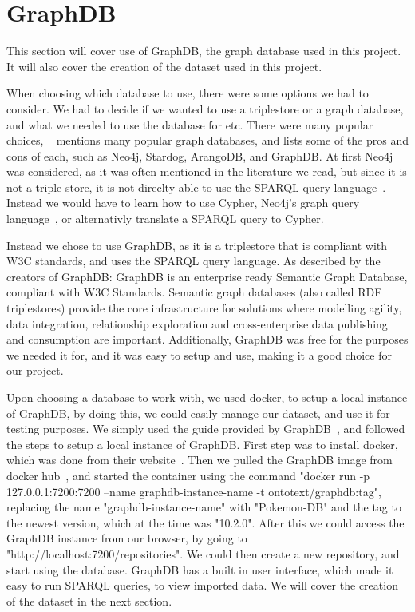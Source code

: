 \section{GraphDB}\label{sec:graphdb}
This section will cover use of GraphDB, the graph database used in this project. It will also cover the creation of the dataset used in this project.

When choosing which database to use, there were some options we had to consider. We had to decide if we wanted to use a triplestore or a graph database, and what we needed to use the database for etc. There were many popular choices, ~\cite{best-graph-databases} mentions many popular graph databases, and lists some of the pros and cons of each, such as Neo4j, Stardog, ArangoDB, and GraphDB. At first Neo4j was considered, as it was often mentioned in the literature we read, but since it is not a triple store, it is not direclty able to use the SPARQL query language~\cite{neo4j:-a-reasonable-RDF-graph-database}. Instead we would have to learn how to use Cypher, Neo4j's graph query language~\cite{cypher-query-language}, or alternativly translate a SPARQL query to Cypher.

Instead we chose to use GraphDB, as it is a triplestore that is compliant with W3C standards, and uses the SPARQL query language. As described by the creators of GraphDB: \cite{graphDB}{GraphDB is an enterprise ready Semantic Graph Database, compliant with W3C Standards. Semantic graph databases (also called RDF triplestores) provide the core infrastructure for solutions where modelling agility, data integration, relationship exploration and cross-enterprise data publishing and consumption are important.}
Additionally, GraphDB was free for the purposes we needed it for, and it was easy to setup and use, making it a good choice for our project.

Upon choosing a database to work with, we used docker, to setup a local instance of GraphDB, by doing this, we could easily manage our dataset, and use it for testing purposes. We simply used the guide provided by GraphDB~\cite{docker-graphDB}, and followed the steps to setup a local instance of GraphDB.
First step was to install docker, which was done from their website~\cite{docker-install}. Then we pulled the GraphDB image from docker hub~\cite{docker-graphDB}, and started the container using the command "docker run -p 127.0.0.1:7200:7200 --name graphdb-instance-name -t ontotext/graphdb:tag", replacing the name "graphdb-instance-name" with "Pokemon-DB" and the tag to the newest version, which at the time was "10.2.0". After this we could access the GraphDB instance from our browser, by going to "http://localhost:7200/repositories". We could then create a new repository, and start using the database. GraphDB has a built in user interface, which made it easy to run SPARQL queries, to view imported data. We will cover the creation of the dataset in the next section.


